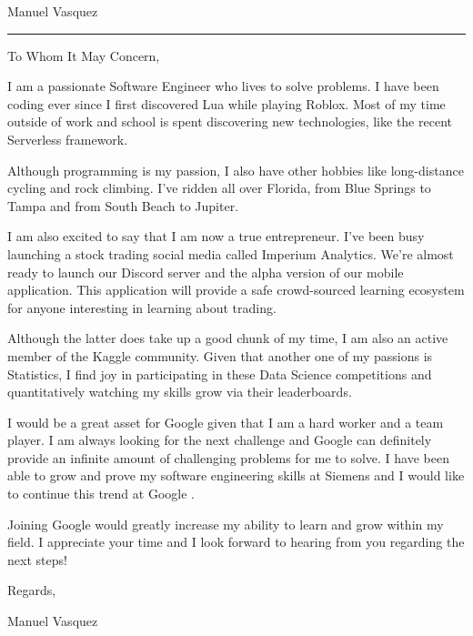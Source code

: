 \documentclass{article}
\newcommand{\position}{I am writing to apply for the \_ position.}
\newcommand{\company}{Google }
\newcommand{\name}{Manuel Vasquez}
\begin{document}
\begin{minipage}[t]{.69\linewidth}
    \begin{center}
        \Huge \name
    \end{center}
    \vspace*{1.89cm}
    \hrule
    \vspace*{.49cm}

    To Whom It May Concern,
    \vspace*{.49cm}

    \raggedright


    I am a passionate Software Engineer who lives to solve problems. I have been coding ever since I first discovered Lua while playing Roblox. Most of my time outside of work and school is spent discovering new technologies, like the recent Serverless framework.
    \vspace*{.49cm}

    Although programming is my passion, I also have other hobbies like long-distance cycling and rock climbing. I've ridden all over Florida, from Blue Springs to Tampa and from South Beach to Jupiter.
    \vspace*{.49cm}

    I am also excited to say that I am now a true entrepreneur. I've been busy launching a stock trading social media called Imperium Analytics. We're almost ready to launch our Discord server and the alpha version of our mobile application. This application will provide a safe crowd-sourced learning ecosystem for anyone interesting in learning about trading.
    \vspace*{.49cm}

    Although the latter does take up a good chunk of my time, I am also an active member of the Kaggle community. Given that another one of my passions is Statistics, I find joy in participating in these Data Science competitions and quantitatively watching my skills grow via their leaderboards.
    \vspace*{.49cm}

    I would be a great asset for \company given that I am a hard worker and a team player. I am always looking for the next challenge and \company can definitely provide an infinite amount of challenging problems for me to solve. I have been able to grow and prove my software engineering skills at Siemens and I would like to continue this trend at \company.
    \vspace*{.49cm}

    Joining \company would greatly increase my ability to learn and grow within my field. I appreciate your time and I look forward to hearing from you regarding the next steps!
    \vspace*{.49cm}

    Regards,
    \vspace*{.49cm}

    \name
\end{minipage}
\end{document}
